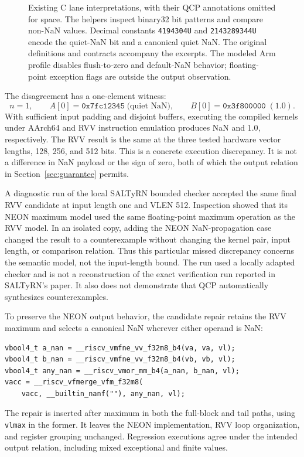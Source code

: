 \begin{figure}[t]

\caption{Existing C lane interpretations, with their QCP annotations omitted for space. The helpers inspect binary32 bit patterns and compare non-NaN values. Decimal constants \texttt{4194304U} and \texttt{2143289344U} encode the quiet-NaN bit and a canonical quiet NaN. The original definitions and contracts accompany the excerpts. The modeled Arm profile disables flush-to-zero and default-NaN behavior; floating-point exception flags are outside the output observation.}
\label{fig:semantics}
\end{figure}

The disagreement has a one-element witness:
\[
 n=1,\qquad A[0]=\mathtt{0x7fc12345}\;\text{(quiet NaN)},\qquad
 B[0]=\mathtt{0x3f800000}\;(1.0).
\]
With sufficient input padding and disjoint buffers, executing the compiled kernels under AArch64 and RVV instruction emulation produces NaN and $1.0$, respectively. The RVV result is the same at the three tested hardware vector lengths, 128, 256, and 512 bits. This is a concrete execution discrepancy. It is not a difference in NaN payload or the sign of zero, both of which the output relation in Section~\ref{sec:guarantee} permits.

A diagnostic run of the local SALTyRN bounded checker accepted the same final RVV candidate at input length one and VLEN 512. Inspection showed that its NEON maximum model used the same floating-point maximum operation as the RVV model. In an isolated copy, adding the NEON NaN-propagation case changed the result to a counterexample without changing the kernel pair, input length, or comparison relation. Thus this particular missed discrepancy concerns the semantic model, not the input-length bound. The run used a locally adapted checker and is not a reconstruction of the exact verification run reported in SALTyRN's paper. It also does not demonstrate that QCP automatically synthesizes counterexamples.

To preserve the NEON output behavior, the candidate repair retains the RVV maximum and selects a canonical NaN wherever either operand is NaN:
\begin{lstlisting}
vbool4_t a_nan = __riscv_vmfne_vv_f32m8_b4(va, va, vl);
vbool4_t b_nan = __riscv_vmfne_vv_f32m8_b4(vb, vb, vl);
vbool4_t any_nan = __riscv_vmor_mm_b4(a_nan, b_nan, vl);
vacc = __riscv_vfmerge_vfm_f32m8(
    vacc, __builtin_nanf(""), any_nan, vl);
\end{lstlisting}
The repair is inserted after maximum in both the full-block and tail paths, using \texttt{vlmax} in the former. It leaves the NEON implementation, RVV loop organization, and register grouping unchanged. Regression executions agree under the intended output relation, including mixed exceptional and finite values. 

